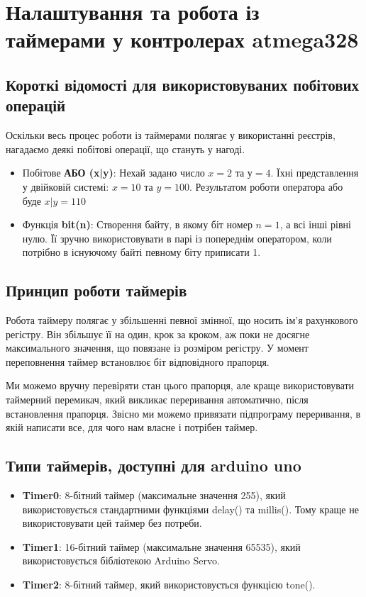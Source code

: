 \chapter{Налаштування та робота із таймерами у контролерах atmega328} 
\label{chapter:first}

\section{Короткі відомості для використовуваних побітових операцій}

Оскільки весь процес роботи із таймерами полягає у використанні реєстрів, нагадаємо деякі побітові операції, що стануть у нагоді.
\begin{itemize}
    \item Побітове \textbf{АБО (x|y)}: Нехай задано число $x = 2$ та $у = 4$. Їхні представлення у двійковій системі: $x= 10$ та $y = 100$. Результатом роботи оператора або буде $x|y = 110$
    \item Функція \textbf{bit(n)}: Створення байту, в якому біт номер $n =1$, а всі інші рівні нулю. Її зручно використовувати в парі із попереднім оператором, коли потрібно в існуючому байті певному біту приписати 1.
\end{itemize}

\section{Принцип роботи таймерів}

Робота таймеру полягає у збільшенні певної змінної, що носить ім'я рахункового регістру. Він збільшує її на один, крок за кроком, аж поки не досягне максимального значення, що повязане із розміром регістру. У момент переповнення таймер встановлює біт відповідного прапорця. 

Ми можемо вручну перевіряти стан цього прапорця, але краще використовувати таймерний перемикач, який викликає переривання автоматично, після встановлення прапорця. Звісно ми можемо привязати підпрограму переривання, в якій написати все, для чого нам власне і потрібен таймер.

\section{Типи таймерів, доступні для arduino uno \cite{habr}}
\begin{itemize}
\item \textbf{Timer0}: 8-бітний таймер (максимальне значення 255), який використовується стандартними функціями delay() та millis(). Тому краще не використовувати цей таймер без потреби.
\item \textbf{Timer1}: 16-бітний таймер (максимальне значення 65535), який використовується бібліотекою Arduino Servo.
\item \textbf{Timer2}: 8-бітний таймер, який використовується функцією tone().
\end{itemize}

